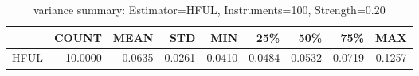 \begin{table}[ht]
\centering
\caption{variance summary: Estimator=HFUL, Instruments=100, Strength=0.20}
\begin{tabular}{lrrrrrrrr}
\toprule
 & COUNT & MEAN & STD & MIN & 25\% & 50\% & 75\% & MAX \\
\midrule
HFUL & 10.0000 & 0.0635 & 0.0261 & 0.0410 & 0.0484 & 0.0532 & 0.0719 & 0.1257 \\
\bottomrule
\end{tabular}
\end{table}
